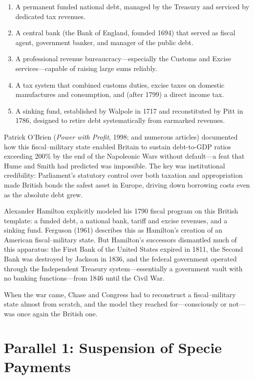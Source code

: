 \documentclass[12pt]{article}
\begin{document}
\begin{enumerate}
\item A permanent funded national debt, managed by the Treasury and
  serviced by dedicated tax revenues.
\item A central bank (the Bank of England, founded 1694) that served as
  fiscal agent, government banker, and manager of the public debt.
\item A professional revenue bureaucracy---especially the Customs and
  Excise services---capable of raising large sums reliably.
\item A tax system that combined customs duties, excise taxes on
  domestic manufactures and consumption, and (after 1799) a direct
  income tax.
\item A sinking fund, established by Walpole in 1717 and reconstituted
  by Pitt in 1786, designed to retire debt systematically from
  earmarked revenues.
\end{enumerate}

Patrick O'Brien (\textit{Power with Profit}, 1998; and numerous
articles) documented how this fiscal--military state enabled Britain to
sustain debt-to-GDP ratios exceeding 200\% by the end of the Napoleonic
Wars without default---a feat that Hume and Smith had predicted was
impossible. The key was institutional credibility: Parliament's statutory
control over both taxation and appropriation made British bonds the
safest asset in Europe, driving down borrowing costs even as the
absolute debt grew.

Alexander Hamilton explicitly modeled his 1790 fiscal program on this
British template: a funded debt, a national bank, tariff and excise
revenues, and a sinking fund. Ferguson (1961) describes this as
Hamilton's creation of an American fiscal--military state. But
Hamilton's successors dismantled much of this apparatus: the First Bank
of the United States expired in 1811, the Second Bank was destroyed by
Jackson in 1836, and the federal government operated through the
Independent Treasury system---essentially a government vault with no
banking functions---from 1846 until the Civil War.

When the war came, Chase and Congress had to reconstruct a fiscal--military
state almost from scratch, and the model they reached for---consciously or
not---was once again the British one.

\section{Parallel 1: Suspension of Specie Payments}
\label{sec:suspension}
\end{document}
